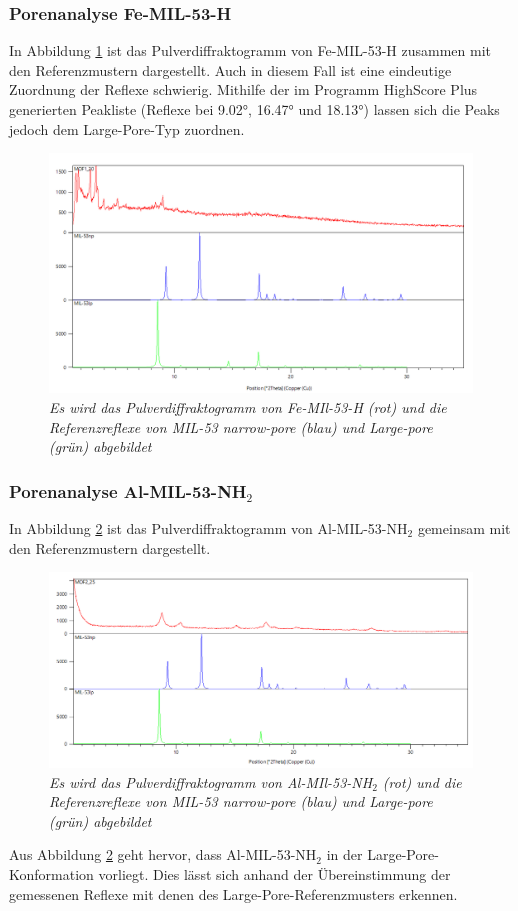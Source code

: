 \documentclass[12pt, a4paper]{article}
\begin{document}
\subsubsection{Porenanalyse Fe-MIL-53-H}
In Abbildung \ref{MOF120ver} ist das Pulverdiffraktogramm von Fe-MIL-53-H zusammen mit den Referenzmustern dargestellt. Auch in diesem Fall ist eine eindeutige Zuordnung der Reflexe schwierig. 
Mithilfe der im Programm HighScore Plus generierten Peakliste (Reflexe bei 9.02°, 16.47° und 18.13°) lassen sich die Peaks jedoch dem Large-Pore-Typ zuordnen.
\newpage
\begin{figure}[!ht]
    \centering
    \includegraphics[scale=0.5]{MOF120ver.png}
    \caption{\textit{Es wird das Pulverdiffraktogramm von Fe-MIl-53-H (rot) und die Referenzreflexe von MIL-53 narrow-pore (blau) und Large-pore (grün) abgebildet}}
    \label{MOF120ver}
\end{figure}

\subsubsection{\texorpdfstring{Porenanalyse Al-MIL-53-NH$_2$}{Porenanalyse Al-MIL-53-NH2}}

In Abbildung \ref{MOF225ver} ist das Pulverdiffraktogramm von Al-MIL-53-NH$_2$ gemeinsam mit den Referenzmustern dargestellt. 
\begin{figure}[!h]
    \centering
    \includegraphics[scale=0.5]{MOF225ver.png}
    \caption{\textit{Es wird das Pulverdiffraktogramm von Al-MIl-53-NH$_2$ (rot) und die Referenzreflexe von MIL-53 narrow-pore (blau) und Large-pore (grün) abgebildet}}
    \label{MOF225ver}
\end{figure}
Aus Abbildung \ref{MOF225ver} geht hervor, dass Al-MIL-53-NH$_2$ in der Large-Pore-Konformation vorliegt. Dies lässt sich anhand der Übereinstimmung der gemessenen Reflexe mit denen des Large-Pore-Referenzmusters erkennen.
\end{document}
